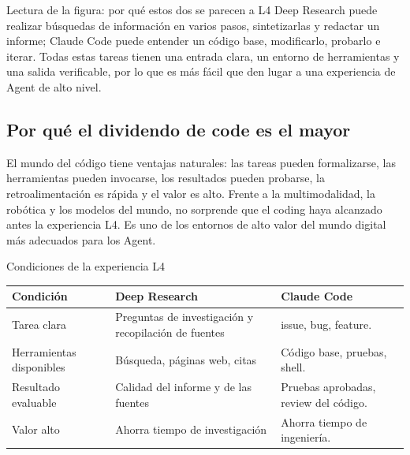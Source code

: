 \documentclass[a4paper]{article}
\begin{document}
\begin{knowledgebox}{Lectura de la figura: por qué estos dos se parecen a L4}
Deep Research puede realizar búsquedas de información en varios pasos, sintetizarlas y redactar un informe; Claude Code puede entender un código base, modificarlo, probarlo e iterar. Todas estas tareas tienen una entrada clara, un entorno de herramientas y una salida verificable, por lo que es más fácil que den lugar a una experiencia de Agent de alto nivel.
\end{knowledgebox}

\subsection{Por qué el dividendo de code es el mayor}

El mundo del código tiene ventajas naturales: las tareas pueden formalizarse, las herramientas pueden invocarse, los resultados pueden probarse, la retroalimentación es rápida y el valor es alto. Frente a la multimodalidad, la robótica y los modelos del mundo, no sorprende que el coding haya alcanzado antes la experiencia L4. Es uno de los entornos de alto valor del mundo digital más adecuados para los Agent.

\begin{knowledgebox}{Condiciones de la experiencia L4}
\begin{tabularx}{\textwidth}{p{}p{}X}
\toprule
Condición & Deep Research & Claude Code \\
\midrule
Tarea clara & Preguntas de investigación y recopilación de fuentes & issue, bug, feature. \\
Herramientas disponibles & Búsqueda, páginas web, citas & Código base, pruebas, shell. \\
Resultado evaluable & Calidad del informe y de las fuentes & Pruebas aprobadas, review del código. \\
Valor alto & Ahorra tiempo de investigación & Ahorra tiempo de ingeniería. \\
\bottomrule
\end{tabularx}
\end{knowledgebox}
\end{document}
